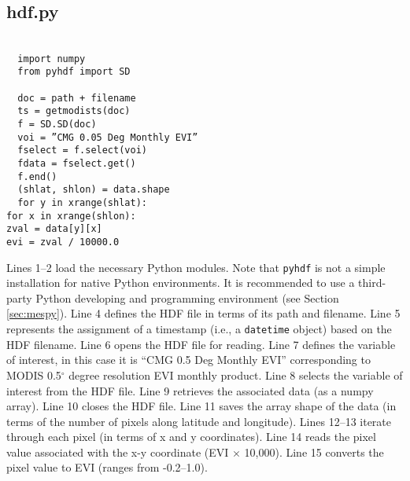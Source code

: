 \subsection{hdf.py}
\label{app:hdfpy}
\texttt{ \\
~~import numpy\\
~~from pyhdf import SD\\
~~\\
~~doc = path + filename\\
~~ts = get\textunderscore modis\textunderscore ts(doc)\\
~~f = SD.SD(doc)\\
~~voi = ''CMG 0.05 Deg Monthly EVI''\\
~~f\textunderscore select = f.select(voi)\\
~~f\textunderscore data = f\textunderscore select.get()\\
~~f.end()\\
~~(sh\textunderscore lat, sh\textunderscore lon) = data.shape\\
~~for y in xrange(sh\textunderscore lat):\\
 \indent for x in xrange(sh\textunderscore lon):\\
 \indent \indent zval = data[y][x]\\
 \indent \indent evi = zval / 10000.0\\
}

Lines 1--2 load the necessary Python modules.  
Note that \texttt{pyhdf} is not a simple installation for native Python environments.  
It is recommended to use a third-party Python developing and programming environment (see Section \ref{sec:mespy}). 
Line 4 defines the HDF file in terms of its path and filename.  
Line 5 represents the assignment of a timestamp (i.e., a \texttt{datetime} object) based on the HDF filename.  
Line 6 opens the HDF file for reading.  
Line 7 defines the variable of interest, in this case it is ``CMG 0.5 Deg Monthly EVI'' corresponding to MODIS 0.5$^{\circ}$ degree resolution EVI monthly product.  
Line 8 selects the variable of interest from the HDF file.  
Line 9 retrieves the associated data (as a numpy array).  
Line 10 closes the HDF file.  
Line 11 saves the array shape of the data (in terms of the number of pixels along latitude and longitude). 
Lines 12--13 iterate through each pixel (in terms of x and y coordinates).  
Line 14 reads the pixel value associated with the x-y coordinate (EVI $\times$ 10,000).  
Line 15 converts the pixel value to EVI (ranges from -0.2--1.0).
